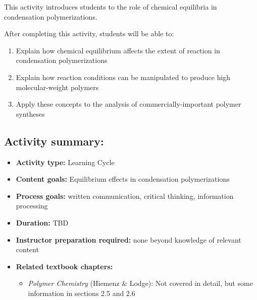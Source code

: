 %
%
%
%

\renewcommand{\figpath}{content/polymchem/stepgrowth/condensation-equilibria/figs}
\renewcommand{\labelbase}{condequilib}

\begin{activity}

\begin{instructornotes}

	This activity introduces students to the role of chemical equilibria in condensation polymerizations.
	
	After completing this activity, students will be able to:
			\begin{enumerate}
				\item Explain how chemical equilibrium affects the extent of reaction in condensation polymerizations
				\item Explain how reaction conditions can be manipulated to produce high molecular-weight polymers
				\item Apply these concepts to the analysis of commercially-important polymer syntheses
			\end{enumerate}
	
			
	\subsection*{Activity summary:}
	\begin{itemize}
		\item \textbf{Activity type:} Learning Cycle
		\item \textbf{Content goals:} Equilibrium effects in condensation polymerizations
		\item \textbf{Process goals:} %
			written communication, critical thinking, information processing
		\item \textbf{Duration:} TBD %
		\item \textbf{Instructor preparation required:} none beyond knowledge of relevant content
		\item \textbf{Related textbook chapters:}
			\begin{itemize}
				\item \emph{Polymer Chemistry} (Hiemenz \& Lodge): Not covered in detail, but some information in sections 2.5 and 2.6
			\end{itemize}
	\end{itemize}


\end{instructornotes}
\end{activity}
